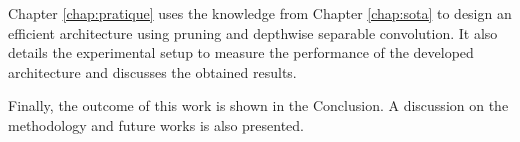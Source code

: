 Chapter \ref{chap:pratique} uses the knowledge from Chapter \ref{chap:sota} to design an efficient architecture using pruning and depthwise separable convolution. It also details the experimental setup to measure the performance of the developed architecture and discusses the obtained results.

Finally, the outcome of this work is shown in the Conclusion. A discussion on the methodology and future works is also presented.
\newpage
